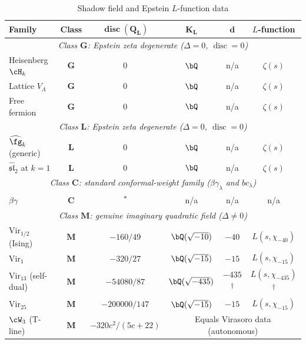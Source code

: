 \begin{table}[ht]
\centering
\caption{Shadow field and Epstein $L$-function data}
\label{tab:shadow-l-functions}
\renewcommand{\arraystretch}{1.4}
{\small
\begin{tabular}{|l|c|c|c|c|c|}
\hline
\textbf{Family}
 & \textbf{Class}
 & $\boldsymbol{\operatorname{disc}(Q_L)}$
 & $\boldsymbol{K_L}$
 & $\boldsymbol{d}$
 & \textbf{$L$-function} \\
\hline
\multicolumn{6}{|c|}{%
 \textit{Class $\mathbf{G}$: Epstein zeta degenerate
 ($\Delta = 0$, $\operatorname{disc} = 0$)}} \\
\hline
Heisenberg $\cH_k$
 & $\mathbf{G}$ & $0$ & $\bQ$ & n/a & $\zeta(s)$ \\
\hline
Lattice $V_\Lambda$
 & $\mathbf{G}$ & $0$ & $\bQ$ & n/a & $\zeta(s)$ \\
\hline
Free fermion
 & $\mathbf{G}$ & $0$ & $\bQ$ & n/a & $\zeta(s)$ \\
\hline
\multicolumn{6}{|c|}{%
 \textit{Class $\mathbf{L}$: Epstein zeta degenerate
 ($\Delta = 0$, $\operatorname{disc} = 0$)}} \\
\hline
$\widehat{\fg}_k$ (generic)
 & $\mathbf{L}$ & $0$ & $\bQ$ & n/a & $\zeta(s)$ \\
\hline
$\widehat{\mathfrak{sl}}_2$ at $k = 1$
 & $\mathbf{L}$ & $0$ & $\bQ$ & n/a & $\zeta(s)$ \\
\hline
\multicolumn{6}{|c|}{%
 \textit{Class $\mathbf{C}$: standard conformal-weight family
 ($\beta\gamma_\lambda$ and $bc_\lambda$)}} \\
\hline
$\beta\gamma$
 & $\mathbf{C}$ & \textsuperscript{$\ast$}
 & n/a & n/a & n/a \\
\hline
\multicolumn{6}{|c|}{%
 \textit{Class $\mathbf{M}$: genuine imaginary quadratic field
 ($\Delta \neq 0$)}} \\
\hline
$\mathrm{Vir}_{1/2}$ (Ising)
 & $\mathbf{M}$ & $-160/49$ & $\bQ(\sqrt{-10})$
 & $-40$ & $L(s, \chi_{-40})$ \\[2pt]
\hline
$\mathrm{Vir}_1$
 & $\mathbf{M}$ & $-320/27$ & $\bQ(\sqrt{-15})$
 & $-15$ & $L(s, \chi_{-15})$ \\[2pt]
\hline
$\mathrm{Vir}_{13}$ (self-dual)
 & $\mathbf{M}$ & $-54080/87$ & $\bQ(\sqrt{-435})$
 & $-435$\textsuperscript{$\dagger$}
 & $L(s, \chi_{-435})$\textsuperscript{$\dagger$} \\[2pt]
\hline
$\mathrm{Vir}_{25}$
 & $\mathbf{M}$ & $-200000/147$
 & $\bQ(\sqrt{-15})$
 & $-15$
 & $L(s, \chi_{-15})$ \\[2pt]
\hline
$\cW_3$ (T-line)
 & $\mathbf{M}$
 & $-320c^2/(5c{+}22)$
 & \multicolumn{3}{c|}{Equals Virasoro data (autonomous)} \\
\hline
\end{tabular}
}%


\end{table}
